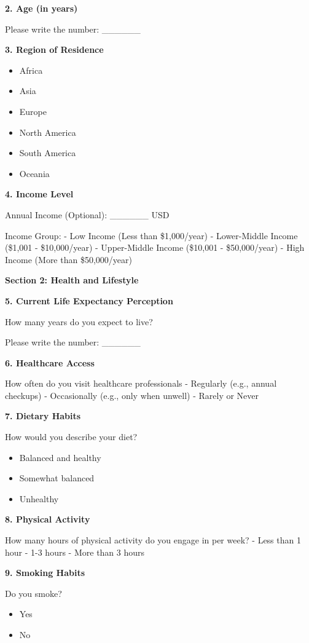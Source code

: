 \documentclass[
  letterpaper,
  DIV=11,
  numbers=noendperiod]{scrartcl}
\providecommand{\tightlist}{%
  \setlength{\itemsep}{0pt}\setlength{\parskip}{0pt}}\usepackage{longtable,booktabs,array}
\begin{document}
\textbf{2. Age (in years)}

Please write the number: \_\_\_\_\_\_

\textbf{3. Region of Residence}

\begin{itemize}
\tightlist
\item
  Africa
\item
  Asia
\item
  Europe
\item
  North America
\item
  South America
\item
  Oceania
\end{itemize}

\textbf{4. Income Level}

Annual Income (Optional): \_\_\_\_\_\_ USD

Income Group: - Low Income (Less than \$1,000/year) - Lower-Middle
Income (\$1,001 - \$10,000/year) - Upper-Middle Income (\$10,001 -
\$50,000/year) - High Income (More than \$50,000/year)

\textbf{Section 2: Health and Lifestyle}

\textbf{5. Current Life Expectancy Perception}

How many years do you expect to live?

Please write the number: \_\_\_\_\_\_

\textbf{6. Healthcare Access}

How often do you visit healthcare professionals - Regularly (e.g.,
annual checkups) - Occasionally (e.g., only when unwell) - Rarely or
Never

\textbf{7. Dietary Habits}

How would you describe your diet?

\begin{itemize}
\tightlist
\item
  Balanced and healthy
\item
  Somewhat balanced
\item
  Unhealthy
\end{itemize}

\textbf{8. Physical Activity}

How many hours of physical activity do you engage in per week? - Less
than 1 hour - 1-3 hours - More than 3 hours

\textbf{9. Smoking Habits}

Do you smoke?

\begin{itemize}
\tightlist
\item
  Yes
\item
  No
\end{itemize}
\end{document}
